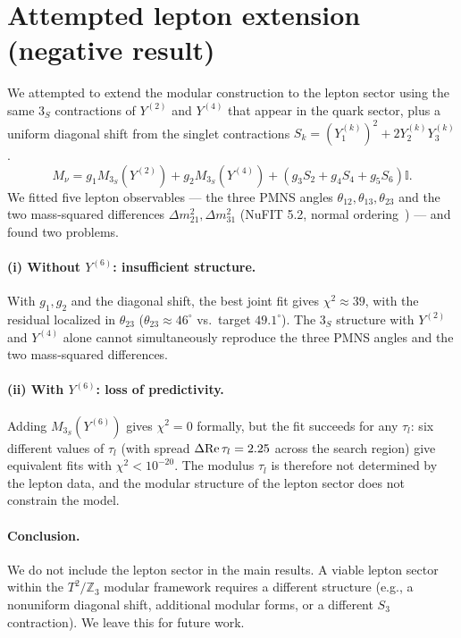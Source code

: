 \documentclass[12pt,a4paper]{article}
\numberwithin{equation}{section}
\begin{document}
\section{Attempted lepton extension (negative result)}
We attempted to extend the modular construction to the lepton sector using the same \(3_S\) contractions of \(Y^{(2)}\) and \(Y^{(4)}\) that appear in the quark sector, plus a uniform diagonal shift from the singlet contractions \(S_k = (Y_1^{(k)})^2 + 2Y_2^{(k)}Y_3^{(k)}\).
\begin{equation}
M_\nu = g_1 M_{3_S}(Y^{(2)}) + g_2 M_{3_S}(Y^{(4)}) + (g_3 S_2 + g_4 S_4 + g_5 S_6)\mathbb{I}.
\end{equation}
We fitted five lepton observables --- the three PMNS angles \(\theta_{12},\theta_{13},\theta_{23}\) and the two mass-squared differences \(\Delta m_{21}^2,\Delta m_{31}^2\) (NuFIT 5.2, normal ordering~\cite{NuFIT2020}) --- and found two problems.

\paragraph{(i) Without \(Y^{(6)}\): insufficient structure.}
With \(g_1,g_2\) and the diagonal shift, the best joint fit gives \(\chi^2\approx 39\), with the residual localized in \(\theta_{23}\) (\(\theta_{23}\approx 46^\circ\) vs.\ target \(49.1^\circ\)). The \(3_S\) structure with \(Y^{(2)}\) and \(Y^{(4)}\) alone cannot simultaneously reproduce the three PMNS angles and the two mass-squared differences.

\paragraph{(ii) With \(Y^{(6)}\): loss of predictivity.}
Adding \(M_{3_S}(Y^{(6)})\) gives \(\chi^2 = 0\) formally, but the fit succeeds for any \(\tau_l\): six different values of \(\tau_l\) (with spread \(\Delta{\rm Re}\,\tau_l = 2.25\) across the search region) give equivalent fits with \(\chi^2< 10^{-20}\). The modulus \(\tau_l\) is therefore not determined by the lepton data, and the modular structure of the lepton sector does not constrain the model.

\paragraph{Conclusion.}
We do not include the lepton sector in the main results. A viable lepton sector within the \(T^2/\mathbb{Z}_3\) modular framework requires a different structure (e.g., a nonuniform diagonal shift, additional modular forms, or a different \(S_3\) contraction). We leave this for future work.
\end{document}
